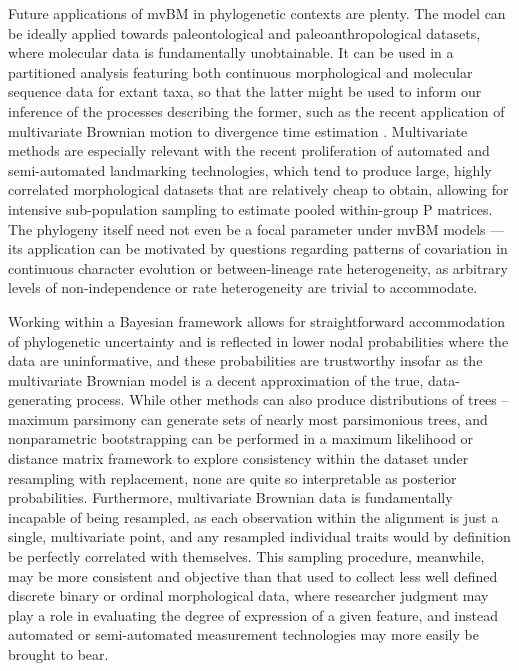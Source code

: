 \documentclass[10pt, twocolumn, twoside]{article}
\begin{document}
Future applications of mvBM in phylogenetic contexts are plenty. The model can be ideally applied towards paleontological and paleoanthropological datasets, where molecular data is fundamentally unobtainable. It can be used in a partitioned analysis featuring both continuous morphological and molecular sequence data for extant taxa, so that the latter might be used to inform our inference of the processes describing the former, such as the recent application of multivariate Brownian motion to divergence time estimation \citep{alvarez-carreteroBayesianEstimationSpecies2019}. Multivariate methods are especially relevant with the recent proliferation of automated and semi-automated landmarking technologies, which tend to produce large, highly correlated morphological datasets that are relatively cheap to obtain, allowing for intensive sub-population sampling to estimate pooled within-group P matrices. The phylogeny itself need not even be a focal parameter under mvBM models — its application can be motivated by questions regarding patterns of covariation in continuous character evolution or between-lineage rate heterogeneity, as arbitrary levels of non-independence or rate heterogeneity are trivial to accommodate. 

Working within a Bayesian framework allows for straightforward accommodation of phylogenetic uncertainty and is reflected in lower nodal probabilities where the data are uninformative, and these probabilities are trustworthy insofar as the multivariate Brownian model is a decent approximation of the true, data-generating process. While other methods can also produce distributions of trees – maximum parsimony can generate sets of nearly most parsimonious trees, and nonparametric bootstrapping can be performed in a maximum likelihood or distance matrix framework to explore consistency within the dataset under resampling with replacement, none are quite so interpretable as posterior probabilities. Furthermore, multivariate Brownian data is fundamentally incapable of being resampled, as each observation within the alignment is just a single, multivariate point, and any resampled individual traits would by definition be perfectly correlated with themselves. This sampling procedure, meanwhile, may be more consistent and objective than that used to collect less well defined discrete binary or ordinal morphological data, where researcher judgment may play a role in evaluating the degree of expression of a given feature, and instead automated or semi-automated measurement technologies may more easily be brought to bear.
\end{document}

